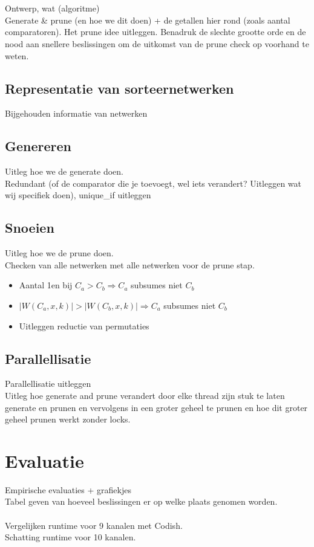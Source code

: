 \documentclass{article}
\begin{document}
~\\\\
Ontwerp, wat (algoritme)\\
Generate \& prune (en hoe we dit doen) + de getallen hier rond (zoals aantal comparatoren). Het prune idee uitleggen. Benadruk de slechte grootte orde en de nood aan snellere beslissingen om de uitkomst van de prune check op voorhand te weten.

\subsection{Representatie van sorteernetwerken}
Bijgehouden informatie van netwerken

\subsection{Genereren}
Uitleg hoe we de generate doen.\\
Redundant (of de comparator die je toevoegt, wel iets verandert? Uitleggen wat wij specifiek doen), unique\_if uitleggen

\subsection{Snoeien}
Uitleg hoe we de prune doen.\\
Checken  van alle netwerken met alle netwerken voor de prune stap.
\begin{itemize}
\item Aantal 1en bij $C_a > C_b \Rightarrow C_a$ subsumes niet $C_b$ 
\item $|W(C_a, x, k)| > |W(C_b, x, k)| \Rightarrow C_a$ subsumes niet $C_b$
\item Uitleggen reductie van permutaties
\end{itemize}

\subsection{Parallellisatie}
Parallellisatie uitleggen\\
Uitleg hoe generate and prune verandert door elke thread zijn stuk te laten generate en prunen en vervolgens in een groter geheel te prunen en hoe dit groter geheel prunen werkt zonder locks.

\section{Evaluatie}
Empirische evaluaties + grafiekjes\\
Tabel geven van hoeveel beslissingen er op welke plaats genomen worden.\\ \\
Vergelijken runtime voor 9 kanalen met Codish.\\
Schatting runtime voor 10 kanalen.\\\\
\end{document}

